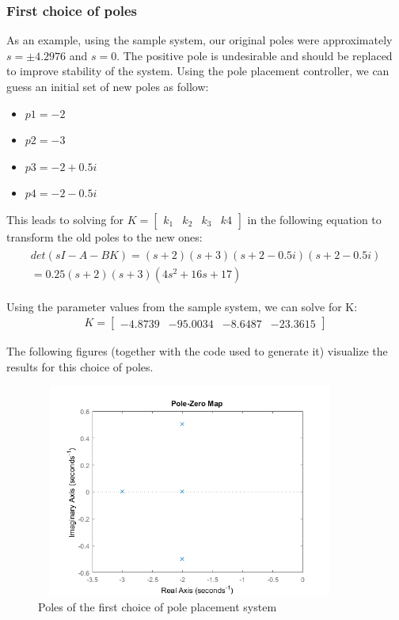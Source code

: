 \documentclass [12pt,letterpaper]{exam}
\begin{document}
\subsubsection{First choice of poles}
As an example, using the sample system, our original poles were approximately $s = \pm4.2976$ and $s = 0$. The positive pole is undesirable and should be replaced to improve stability of the system. Using the pole placement controller, we can guess an initial set of new poles as follow:
\begin{itemize}
    \item $p1 = -2$
    \item $p2 = -3$
    \item $p3 = -2 + 0.5i$
    \item $p4 = -2 - 0.5i$
\end{itemize}

This leads to solving for $K = \begin{bmatrix}
k_1 & k_2 & k_3 & k4
\end{bmatrix}$ in the following equation to transform the old poles to the new ones:
\begin{align}
\begin{split}
det(sI - A - BK) = (s + 2)(s + 3)(s + 2 - 0.5i)(s + 2 - 0.5i) \\
= 0.25(s + 2)(s + 3)(4s^2 + 16s + 17)
\end{split}
\end{align}

Using the parameter values from the sample system, we can solve for K:
\begin{align}
K = \begin{bmatrix}
-4.8739 & -95.0034 & -8.6487 & -23.3615
\end{bmatrix}
\end{align}

The following figures (together with the code used to generate it) visualize the results for this choice of poles.
\begin{figure}[H]
  \centering
    \includegraphics[width=10.15cm, height=7cm]{pl_poles} 
  \caption{Poles of the first choice of pole placement system}
  \label{fig:pl_poles}
\end{figure}
\end{document}
